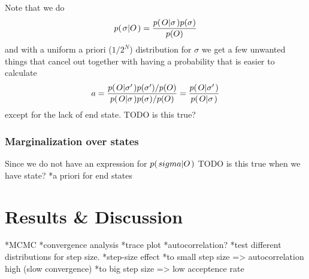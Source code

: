 \documentclass[a4paper,11pt]{kth-mag}
\begin{document}
                Note that we do
                \begin{equation}
                    p{(\left. \sigma \middle\vert O \right.)} = \frac{p{(\left. O \middle\vert \sigma \right.)}p{(\sigma)}}{p{(O)}}
                \end{equation}
                and with a uniform a priori ($1/{2^N}$) distribution for $\sigma$ we get 
                a few unwanted things that cancel out together with having a probability 
                that is easier to calculate
                \begin{equation}
                    a = \frac{
                            p{(\left. O \middle\vert \sigma' \right.)}p{(\sigma')}/p{(O)}
                        }{
                            p{(\left. O \middle\vert \sigma \right.)}p{(\sigma)}/p{(O)}
                        }
                      = \frac{
                            p{(\left. O \middle\vert \sigma' \right.)}
                        }{
                            p{(\left. O \middle\vert \sigma \right.)}
                        }
                \end{equation}
                except for the lack of end state. 
                TODO is this true?

            \subsection{Marginalization over states}
                Since we do not have an expression for $p{(\left. sigma \middle\vert O \right.)}$ TODO is this true when we have state?
                *a priori for end states

    \chapter{Results \& Discussion}
        *MCMC
            *convergence analysis
                *trace plot
                *autocorrelation?
                *test different distributions for step size.
                    *step-size effect
                        *to small step size => autocorrelation high (slow convergence)
                        *to big step size => low acceptence rate
\end{document}
